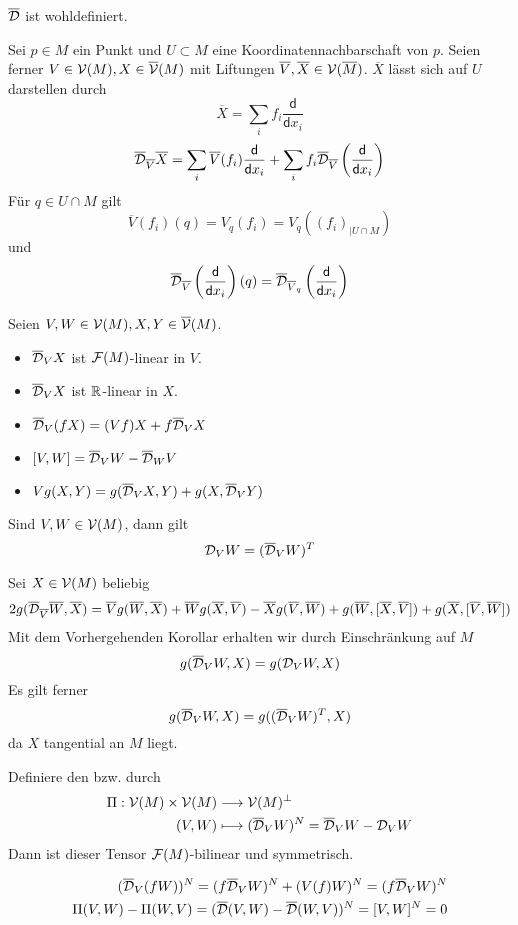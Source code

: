 \documentclass{book}
\renewcommand{\d}{\textsf{d}}
\renewcommand{\l}[1]{\overline{#1}}
\begin{document}
\Lem{}
$\l\D$ ist wohldefiniert.
\begin{Beweis}{}
Sei $p \in M$ ein Punkt und $U \subset M$ eine Koordinatennachbarschaft von $p$. Seien ferner $V \in \V(M), X \in \l\V(M)$ mit Liftungen $\l{V},\l{X} \in \V(\l M)$. $\l{X}$ lässt sich auf $U$ darstellen durch
\[ \l{X} = \sum_{i} f_i \frac{\d}{\d x_i} \]
\[ \l\D_{\l{V}}\l{X} = \sum_i \l{V}(f_i) \frac{\d}{\d x_i} + \sum_i f_i \l\D_{\l{V}}\klam{\frac{\d}{\d x_i}} \]
Für $q \in U\cap M$ gilt
\[\l{V}(f_i)(q) = V_q(f_i) = V_q((f_i)_{|U\cap M}) \]
und
\[ \l\D_{\l{V}}\klam{\frac{\d}{\d x_i}}(q) = \l\D_{\l{V}_q}\klam{\frac{\d}{\d x_i}} \]
\end{Beweis}
\Kor{}
Seien $V,W \in \V(M), X,Y \in \l \V(M)$.
\begin{itemize}
\item $\l \D_VX$ ist $\mathcal{F}(M)$-linear in $V$.
\item $\l\D_VX$ ist $\mathbb{R}$-linear in $X$.
\item $\l\D_V(fX) = (Vf) X + f\l\D_VX$
\item $[V,W] = \l\D_VW - \l\D_WV$
\item $Vg(X,Y) = g(\l \D_VX, Y) + g(X, \l \D_VY)$
\end{itemize}
\Lem{}
Sind $V,W \in \mathcal{V}(M)$, dann gilt
\[ \D_VW = (\l\D_VW)^T \]
\begin{Beweis}{}
Sei $X \in \mathcal{V}(M)$ beliebig
\begin{align*}
2g(\l{\D}_{\l{V}}\l{W}, \l{X}) = \l{V}g(\l{W},\l{X}) + \l{W}g(\l{X},\l{V}) - \l{X}g(\l{V},\l{W}) + g(\l{W},[\l{X},\l{V}]) + g(\l X, [\l V,\l W])
\end{align*}
Mit dem Vorhergehenden Korollar erhalten wir durch Einschränkung auf $M$
\[ g(\l{\D}_{V}W, X) = g(\D_{V}W, X) \]
Es gilt ferner
\[ g(\l{\D}_{V}W, X) = g((\l{\D}_{V}W)^T, X) \]
da $X$ tangential an $M$ liegt.
\end{Beweis}

\Lem{}
Definiere den  bzw.  durch
\begin{align*}
\Pi : \V(M) \times \V(M) &\Pfeil{} \V(M)^\bot\\
(V,W) & \longmapsto (\l\D_VW)^N = \l\D_VW - \D_VW
\end{align*}
Dann ist dieser Tensor $\mathcal{F}(M)$-bilinear und symmetrisch.
\begin{Beweis}{}
\begin{align*}
(\l\D_V(fW))^N = (f\l\D_VW)^N + (V(f) W)^N = (f\l\D_VW)^N\\
\Pi(V,W) - \Pi(W,V) = (\l\D(V,W) - \l\D(W,V))^N = [V,W]^N = 0
\end{align*}
\end{Beweis}
\end{document}
